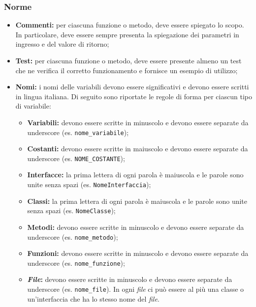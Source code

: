 \subsubsection{Norme}
\begin{itemize}
	\item \textbf{Commenti:} per ciascuna funzione o metodo, deve essere
	      spiegato lo scopo. In particolare, deve essere sempre presenta la
	      spiegazione dei parametri in ingresso e del valore di ritorno;

	\item \textbf{Test:} per ciascuna funzione o metodo, deve essere presente
	      almeno un test che ne verifica il corretto funzionamento e fornisce un
	      esempio di utilizzo;

	\item \textbf{Nomi:} i nomi delle variabili devono essere significativi e
	      devono essere scritti in lingua italiana. Di seguito sono riportate
	      le regole di forma per ciascun tipo di variabile:
	      \begin{itemize}
		      \item \textbf{Variabili:} devono essere scritte in minuscolo e
		            devono essere separate da underscore (es.
		            \texttt{nome\_variabile});

		      \item \textbf{Costanti:} devono essere scritte in maiuscolo e
		            devono essere separate da underscore (es.
		            \texttt{NOME\_COSTANTE});

		      \item \textbf{Interfacce:} la prima lettera di ogni parola è
		            maiuscola e le parole sono unite senza spazi (es.
		            \texttt{NomeInterfaccia});

		      \item \textbf{Classi:} la prima lettera di ogni parola è
		            maiuscola e le parole sono unite senza spazi (es.
		            \texttt{NomeClasse});

		      \item \textbf{Metodi:} devono essere scritte in minuscolo e
		            devono essere separate da underscore (es.
		            \texttt{nome\_metodo});

		      \item \textbf{Funzioni:} devono essere scritte in minuscolo e
		            devono essere separate da underscore (es.
		            \texttt{nome\_funzione});

		      \item \textbf{\textit{File}:} devono essere scritte in minuscolo e
		            devono essere separate da underscore (es.
		            \texttt{nome\_file}). In ogni \textit{file} ci può essere al
		            più una classe o un'interfaccia che ha lo stesso nome del
		            \textit{file}.
	      \end{itemize}
\end{itemize}

